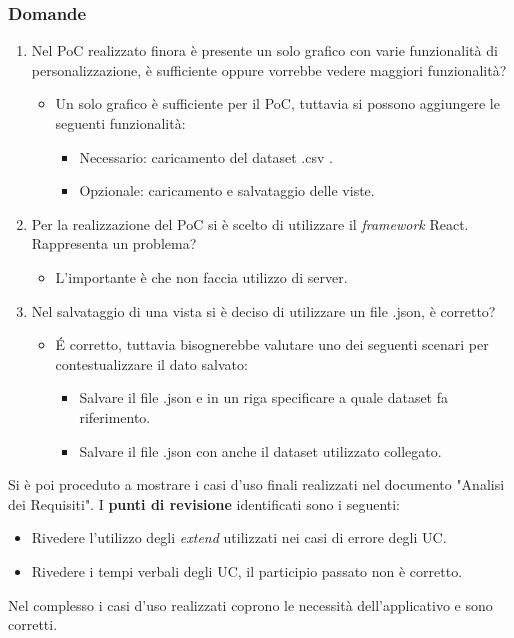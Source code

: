 \subsubsection{Domande}
\begin{enumerate}
	\item Nel PoC realizzato finora è presente un solo grafico con varie funzionalità di personalizzazione, è sufficiente oppure vorrebbe vedere maggiori funzionalità?
	\begin{itemize}
		\item Un solo grafico è sufficiente per il PoC, tuttavia si possono aggiungere le seguenti funzionalità:
		\begin{itemize}
			\item Necessario: caricamento del dataset .csv .
			\item Opzionale: caricamento e salvataggio delle viste.
		\end{itemize}
	\end{itemize}
	\item Per la realizzazione del PoC si è scelto di utilizzare il \textit{framework} React. Rappresenta un problema?
	\begin{itemize}
		\item L'importante è che non faccia utilizzo di server.
	\end{itemize}
	\item Nel salvataggio di una vista si è deciso di utilizzare un file .json, è corretto?
	\begin{itemize}
		\item \' E corretto, tuttavia bisognerebbe valutare uno dei seguenti scenari per contestualizzare il dato salvato:
		\begin{itemize}
			\item Salvare il file .json e in un riga specificare a quale dataset fa riferimento.
			\item Salvare il file .json con anche il dataset utilizzato collegato.
		\end{itemize}
	\end{itemize}
\end{enumerate}

\noindent
Si è poi proceduto a mostrare i casi d'uso finali realizzati nel documento "Analisi dei Requisiti".
I \textbf{punti di revisione} identificati sono i seguenti:
\begin{itemize}
	\item Rivedere l'utilizzo degli \textit{extend} utilizzati nei casi di errore degli UC.
	\item Rivedere i tempi verbali degli UC, il participio passato non è corretto.
\end{itemize}
Nel complesso i casi d'uso realizzati coprono le necessità dell'applicativo e sono corretti.

